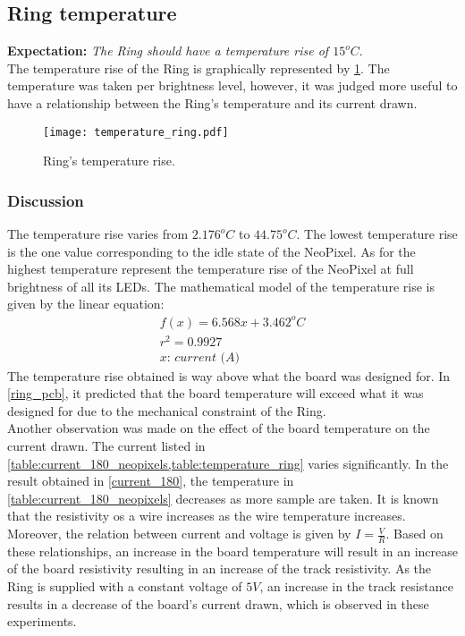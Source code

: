 \subsection{Ring temperature}
\textbf{Expectation:} \textit{The Ring should have a temperature rise of $15^oC$}.\\
The temperature rise of the Ring is graphically represented by \cref{fig:temperature_ring}. The temperature was taken per brightness level, however, it was judged more useful to have a relationship between the Ring's temperature and its current drawn. 
\begin{figure}[ht]
	\centering
	\texttt{[image: temperature\_ring.pdf]}
	\caption{Ring's temperature rise.}
	\label{fig:temperature_ring}
\end{figure}

\subsubsection{Discussion}
The temperature rise varies from $2.176^oC$ to $44.75^oC$. The lowest temperature rise is the one value corresponding to the idle state of the NeoPixel. As for the highest temperature represent the temperature rise of the NeoPixel at full brightness of all its LEDs. The mathematical model of the temperature rise is given by the linear equation:
\begin{equation}
\label{eq:f_temp}
\begin{multlined}
f(x) = 6.568x+3.462 ^oC\\
r^2 = 0.9927\\
\textit{$x$: current (A)}
\end{multlined}
\end{equation}  
The temperature rise obtained is way above what the board was designed for. In \cref{ring_pcb}, it predicted that the board temperature will exceed what it was designed for due to the mechanical constraint of the Ring. \\
Another observation was made on the effect of the board temperature on the current drawn. The current listed in \cref{table:current_180_neopixels,table:temperature_ring} varies significantly. In the result obtained in \cref{current_180}, the temperature in \cref{table:current_180_neopixels} decreases as more sample are taken. It is known that the resistivity os a wire increases as the wire temperature increases. Moreover, the relation between current and voltage is given by $I=\frac{V}{R}$. Based on these relationships, an increase in the board temperature will result in an increase of the board resistivity resulting in an increase of the track resistivity. As the Ring is supplied with a constant voltage of $5V$, an increase in the track resistance results in a decrease of the board's current drawn, which is observed in these experiments.\\

